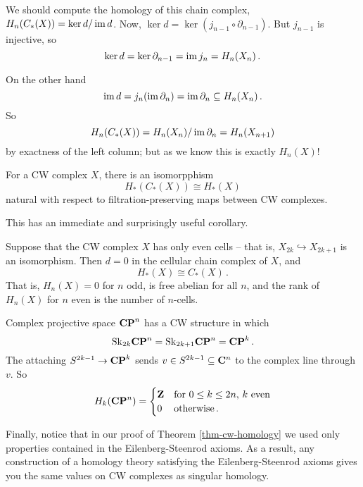 We should compute the homology of this chain complex, $ H_n(C_\ast(X))=\ker d/\operatorname{im} d$. Now, $\ker d=\ker (j_{n-1}\circ\partial_{n-1})$. But $j_{n-1}$ is injective, so 
\[
\ker d=\ker\partial_{n-1}=\operatorname{im} j_n=H_n(X_n)\,.
\]

On the other hand 
\[
\operatorname{im} d=j_n(\operatorname{im}\partial_n)=\operatorname{im}\partial_n\subseteq H_n(X_n)\,.
\]
So 
\[
H_n(C_*(X))=H_n(X_n)/\operatorname{im}\partial_n=H_n(X_{n+1})
\]
by exactness of the left column; but as we know this is exactly $H_n(X)$!
\begin{theorem} \label{thm-cw-homology}
For a CW complex $X$, there is an isomorpphism
\[
H_\ast(C_\ast(X))\cong H_\ast(X)
\]
natural with respect to filtration-preserving maps between CW complexes.
\end{theorem}
This has an immediate and surprisingly useful corollary.
\begin{corollary}
Suppose that the CW complex $X$ has only even cells -- that is, 
$X_{2k}\hookrightarrow X_{2k+1}$ is an isomorphism. Then $d=0$ in the
cellular chain complex of $X$, and 
\[
H_*(X)\cong C_*(X)\,.
\]
That is, $H_n(X)=0$ for $n$ odd, is free abelian for all $n$, 
and the rank of $H_n(X)$ for $n$ even is the number of $n$-cells. 
\end{corollary}
\begin{example}
Complex projective space $\mathbf{CP}^n$ has a CW structure in which 
\[
\mathrm{Sk}_{2k}\mathbf{CP}^n=\mathrm{Sk}_{2k+1}\mathbf{CP}^n=\mathbf{CP}^k\,.
\] 
The attaching $S^{2k-1}\to\mathbf{CP}^k$
sends $v\in S^{2k-1}\subseteq\mathbf C^n$ to the complex line through $v$. So 
\[
H_k(\mathbf{CP}^n)=\begin{cases}\mathbf Z & \hbox{for}\,\,0\leq k\leq 2n,\, k\,\,\hbox{even}\\
0 & \hbox{otherwise}
\,.\end{cases}
\]
\end{example}

Finally, notice that in our proof of Theorem \ref{thm-cw-homology} we used only properties contained in the Eilenberg-Steenrod axioms. As a result,
any construction of a homology theory satisfying the Eilenberg-Steenrod axioms gives you the same values on CW complexes as singular homology. 
